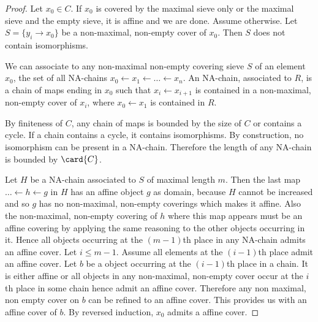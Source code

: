 \begin{proof}
Let $x_0\in C$. 
If $x_0$ is covered by the maximal sieve only or the maximal sieve and the empty sieve, it is affine and we are done. 
Assume otherwise.
Let $S = \{y_i \rightarrow x_0\}$ be a non-maximal, non-empty cover of $x_0$.
Then $S$ does not contain isomorphisms.

We can associate to any non-maximal non-empty covering sieve $S$ of an element $x_0$,
the set of all NA-chains $x_0\leftarrow x_1 \leftarrow \ldots \leftarrow x_n$.
An NA-chain, associated to $R$, is a chain of maps ending in $x_0$ such that $x_i \leftarrow x_{i+1}$ is contained in a non-maximal, 
non-empty cover of $x_i$, where $x_0\leftarrow x_1$ is contained in $R$.

By finiteness of $C$, any chain of maps is bounded by the size of $C$ or contains a cycle. 
If a chain contains a cycle, it contains isomorphisms. 
By construction, no isomorphism can be present in a NA-chain. 
Therefore the length of any NA-chain is bounded by $\card{C}$.

Let $H$ be a NA-chain associated to $S$ of maximal length $m$. 
Then the last map $\ldots \leftarrow h \leftarrow g$ in $H$ has an affine object $g$ as domain,
because $H$ cannot be increased and so $g$ has no non-maximal, non-empty coverings which makes it affine.
Also the non-maximal, non-empty covering of $h$ where this map appears must be an affine covering by applying the same reasoning to the other objects occurring in it. 
Hence all objects occurring at the $(m-1)$th place in any NA-chain admits an affine cover.
Let $i\leq m-1$. Assume all elements at the $(i-1)$th place admit an affine cover. 
Let $b$ be a object occurring at the $(i-1)$th place in a chain. It is either affine or all objects in any non-maximal, non-empty cover occur at the $i$th place in some chain hence admit an affine cover. Therefore any non maximal, non empty cover on $b$ can be refined to an affine cover. This provides us with an affine cover of $b$.
By reversed induction, $x_0$ admits a affine cover.
\end{proof}
